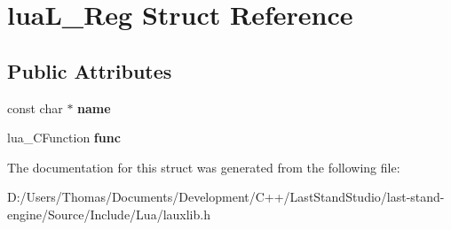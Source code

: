 \hypertarget{structluaL__Reg}{}\section{lua\+L\+\_\+\+Reg Struct Reference}
\label{structluaL__Reg}
\subsection*{Public Attributes}
\begin{DoxyCompactItemize}
\item 
\hypertarget{structluaL__Reg_a58b99f63b304e5c489b90d812f92cba2}{}const char $\ast$ {\bfseries name}\label{structluaL__Reg_a58b99f63b304e5c489b90d812f92cba2}

\item 
\hypertarget{structluaL__Reg_a54aa8f9955870caf78148514e61196ce}{}lua\+\_\+\+C\+Function {\bfseries func}\label{structluaL__Reg_a54aa8f9955870caf78148514e61196ce}

\end{DoxyCompactItemize}


The documentation for this struct was generated from the following file\+:\begin{DoxyCompactItemize}
\item 
D\+:/\+Users/\+Thomas/\+Documents/\+Development/\+C++/\+Last\+Stand\+Studio/last-\/stand-\/engine/\+Source/\+Include/\+Lua/lauxlib.\+h\end{DoxyCompactItemize}

